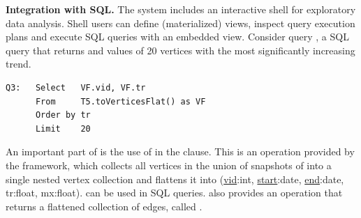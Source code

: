 {\bf Integration with SQL.} The \ql system
includes an interactive shell for exploratory data analysis.  Shell
users can define (materialized) \tg views, inspect query execution
plans and execute SQL queries with an embedded \ql view.  Consider
query , a SQL query that returns  and 
values of 20 vertices with the most significantly increasing
 trend.


\begin{small}
\begin{verbatim}
Q3:   Select   VF.vid, VF.tr  
      From     T5.toVerticesFlat() as VF
      Order by tr
      Limit    20
\end{verbatim}
\end{small}

An important part of  is the use of
 in the  clause.  This is an
operation provided by the \ql framework, which collects all vertices
in the union of snapshots of  into a single nested vertex
collection and flattens it into  (\underline{vid}:int,
\underline{start}:date, \underline{end}:date, tr:float, mx:float).
 can be used in SQL queries.  \ql also provides an operation
that returns a flattened collection of edges, called
.

